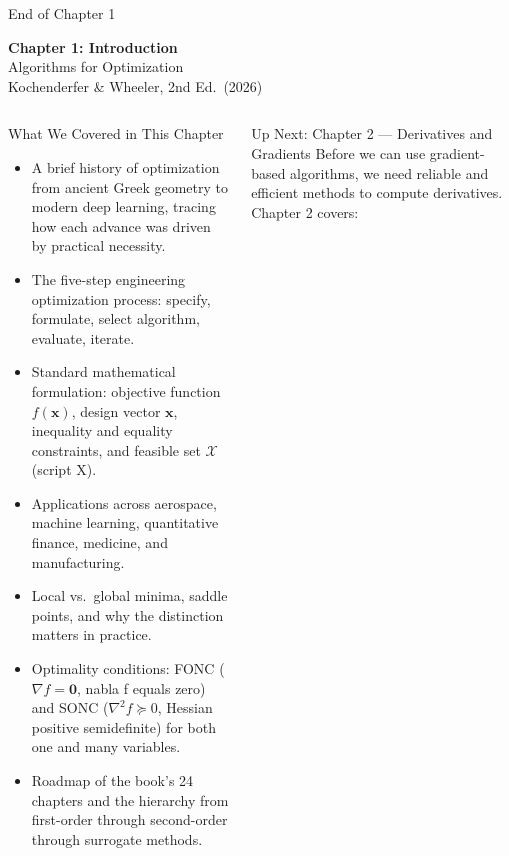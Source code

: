 \documentclass[aspectratio=169,10pt]{beamer}
\newcommand{\vx}{\mathbf{x}}
\newcommand{\grad}{\nabla}
\newcommand{\hess}{\nabla^2}
\begin{document}
\begin{frame}{End of Chapter 1}
  \begin{center}
    \LARGE\textbf{Chapter 1: Introduction}\\[1em]
    \large Algorithms for Optimization\\[0.5em]
    \normalsize Kochenderfer \& Wheeler, 2nd Ed.\ (2026)
  \end{center}
  \vspace{1em}
  \begin{columns}[c]
      \begin{block}{What We Covered in This Chapter}
        \begin{itemize}
          \item A brief history of optimization from ancient Greek geometry
            to modern deep learning, tracing how each advance was driven by
            practical necessity.
          \item The five-step engineering optimization process: specify,
            formulate, select algorithm, evaluate, iterate.
          \item Standard mathematical formulation: objective function $f(\vx)$,
            design vector $\vx$, inequality and equality constraints, and
            feasible set $\mathcal{X}$ (script X).
          \item Applications across aerospace, machine learning,
            quantitative finance, medicine, and manufacturing.
          \item Local vs.\ global minima, saddle points, and why the
            distinction matters in practice.
          \item Optimality conditions: FONC ($\grad f = \mathbf{0}$, nabla f
            equals zero) and SONC ($\hess f \succeq 0$, Hessian positive
            semidefinite) for both one and many variables.
          \item Roadmap of the book's 24 chapters and the hierarchy from
            first-order through second-order through surrogate methods.
        \end{itemize}
      \end{block}
      \begin{block}{Up Next: Chapter 2 --- Derivatives and Gradients}
        Before we can use gradient-based algorithms, we need reliable and
        efficient methods to compute derivatives.  Chapter 2 covers:
        \begin{itemize}

\end{itemize}
\end{block}
\end{columns}
\end{frame}
\end{document}
